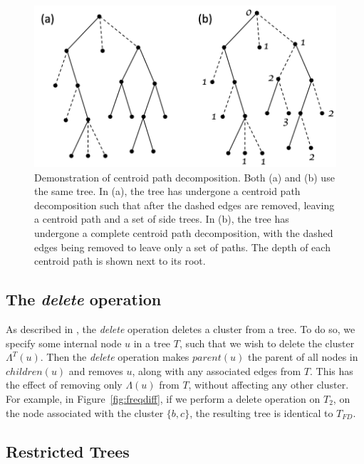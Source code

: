 \documentclass[12pt,a4paper]{article}
\newcommand{\leafset}{\Lambda}
\begin{document}
    \begin{figure}[ht]
        \includegraphics[scale=0.5]{centroid}
        \centering
        \caption[Centroid path decomposition]{Demonstration of centroid path decomposition. Both (a) and (b) use the same tree. In (a), the tree has undergone a centroid path decomposition such that after the dashed edges are removed, leaving a centroid path and a set of side trees. In (b), the tree has undergone a complete centroid path decomposition, with the dashed edges being removed to leave only a set of paths. The depth of each centroid path is shown next to its root.}
        \label{fig:centroid}
    \end{figure}

    \subsection{The \textit{delete} operation}
    \label{subsec:delete}

    As described in \cite{jansson2018algorithms}, the \textit{delete} operation deletes a cluster from a tree. To do so, we specify some internal node $u$ in a tree $T$, such that we wish to delete the cluster $\leafset^{T}(u)$. Then the \textit{delete} operation makes $parent(u)$ the parent of all nodes in $children(u)$ and removes $u$, along with any associated edges from $T$. This has the effect of removing only $\leafset(u)$ from $T$, without affecting any other cluster. For example, in Figure~\ref{fig:freqdiff}, if we perform a delete operation on $T_2$, on the node associated with the cluster $\{b, c\}$, the resulting tree is identical to $T_{FD}$.

    \subsection{Restricted Trees}
    \label{subsec:restrictedtree}
\end{document}
